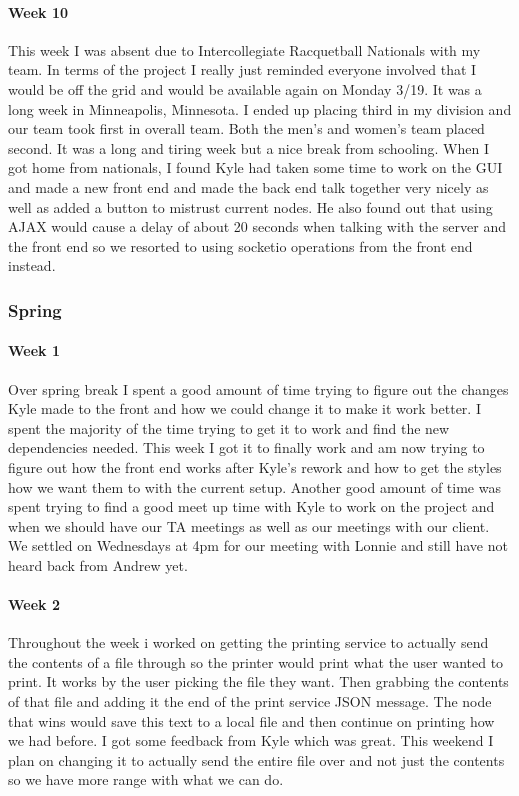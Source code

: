 \documentclass[draftclsnofoot, onecolumn, compsoc, 10pt]{IEEEtran}
\begin{document}
\paragraph{Week 10}
This week I was absent due to Intercollegiate Racquetball Nationals with my team. In terms of the project I really just reminded everyone involved that I would be off the grid and would be available again on Monday 3/19. It was a long week in Minneapolis, Minnesota. I ended up placing third in my division and our team took first in overall team. Both the men's and women's team placed second. It was a long and tiring week but a nice break from schooling.  When I got home from nationals, I found Kyle had taken some time to work on the GUI and made a new front end and made the back end talk together very nicely as well as added a button to mistrust current nodes. He also found out that using AJAX would cause a delay of about 20 seconds when talking with the server and the front end so we resorted to using socketio operations from the front end instead. 

\subsubsection{Spring}
\paragraph{Week 1}
Over spring break I spent a good amount of time trying to figure out the changes Kyle made to the front and how we could change it to make it work better. I spent the majority of the time trying to get it to work and find the new dependencies needed. This week I got it to finally work and am now trying to figure out how the front end works after Kyle's rework and how to get the styles how we want them to with the current setup. Another good amount of time was spent trying to find a good meet up time with Kyle to work on the project and when we should have our TA meetings as well as our meetings with our client. We settled on Wednesdays at 4pm for our meeting with Lonnie and still have not heard back from Andrew yet.
\paragraph{Week 2}
Throughout the week i worked on getting the printing service to actually send the contents of a file through so the printer would print what the user wanted to print. It works by the user picking the file they want. Then grabbing the contents of that file and adding it the end of the print service JSON message. The node that wins would save this text to a local file and then continue on printing how we had before. I got some feedback from Kyle which was great. This weekend I plan on changing it to actually send the entire file over and not just the contents so we have more range with what we can do.
\end{document}
